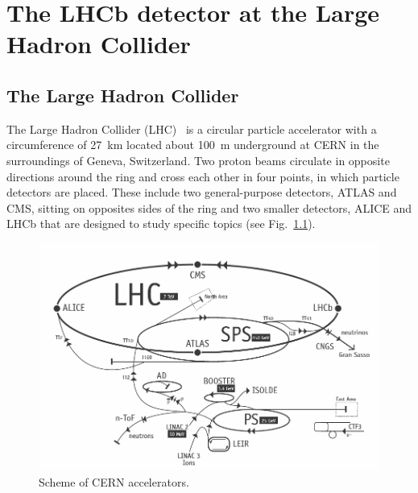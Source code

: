 \chapter{The LHCb detector at the Large Hadron Collider}
\label{ch:detector}

\section{The Large Hadron Collider}

The Large Hadron Collider (LHC)~\cite{Evans:2009zzc} is a circular particle accelerator with a circumference 
of 27~km located about 100~m underground at CERN in the surroundings of Geneva, Switzerland. 
Two proton beams circulate in opposite directions around the ring and cross each
other in four points, in which particle detectors are placed. These include two general-purpose detectors, 
ATLAS and CMS, sitting on opposites sides of the ring and two smaller detectors, 
ALICE and LHCb that are designed to study specific topics (see Fig.~\ref{fig:lhc}).

\begin{figure}[h!]
\centering
\includegraphics[width=1\textwidth]{Detector/figs/LHC_scheme.png}
\caption{Scheme of CERN accelerators.} 
\label{fig:lhc}
\end{figure}

